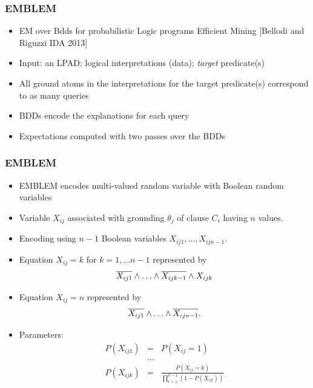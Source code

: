 \documentclass[trans,aspectratio=1610]{beamer}
\newcommand{\ranvar}[1]{%
\ensuremath{{#1}}}
\newcommand{\myalert}[1]{{%
 #1}}
\begin{document}
\begin{frame}
 \frametitle{EMBLEM}

 \begin{itemize}
	\item EM over Bdds for probabilistic Logic programs Efficient Mining [Bellodi and Riguzzi IDA 2013]
		\item Input: an LPAD; logical interpretations (data); \textit{target} predicate(s)
		\item \myalert{All ground atoms} in the interpretations for the target predicate(s) \myalert{correspond to as many queries}
		\item \myalert{BDDs} encode the explanations \myalert{for each query} 
\item Expectations computed with two passes over the BDDs
				\end{itemize}

\end{frame}

\begin{frame}
 \frametitle{EMBLEM}
  \begin{itemize}
\item EMBLEM encodes multi-valued random variable with Boolean random variables 
\item Variable $\ranvar{X}_{ij}$ associated with  grounding $\theta_j$ of clause $C_i$
having $n$ values. 
\item Encoding using $n-1$ Boolean variables 
$\ranvar{X}_{ij1},\ldots,\ranvar{X}_{ijn-1}.$
\item
 Equation $\ranvar{X}_{ij}=k$ for $k=1,\ldots n-1$ represented by
  $$\overline{\ranvar{X}_{ij1}}\wedge\ldots \wedge \overline{\ranvar{X}_{ijk-1}}\wedge \ranvar{X}_{ijk}$$
  \item Equation $\ranvar{X}_{ij}=n$ represented by 
  $$\overline{\ranvar{X}_{ij1}}\wedge\ldots \wedge\overline{\ranvar{X}_{ijn-1}}.$$
\item Parameters:
\begin{eqnarray*}
P(\ranvar{X}_{ij1})&=&P(\ranvar{X}_{ij}=1)\\
&\ldots&\\
 P(\ranvar{X}_{ijk})&=&\frac{P(\ranvar{X}_{ij}=k)}{\prod_{l=1}^{k-1}(1-P(\ranvar{X}_{ijl}))}
 \end{eqnarray*}
 \end{itemize}
\end{frame}
\end{document}
